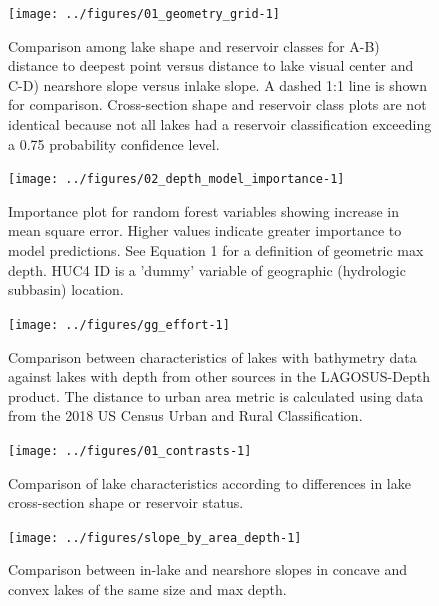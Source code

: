 \documentclass[draft,wrr]{agutexSI2019}
\begin{document}
\begin{figure}
      \noindent\texttt{[image: ../figures/01\_geometry\_grid-1]}
      \caption{Comparison among lake shape and reservoir classes for A-B) distance to deepest point versus distance to lake visual center and C-D) nearshore slope versus inlake slope. A dashed 1:1 line is shown for comparison. Cross-section shape and reservoir class plots are not identical because not all lakes had a reservoir classification exceeding a 0.75 probability confidence level.}\label{figS4}
      \end{figure}

\begin{figure}
      \noindent\texttt{[image: ../figures/02\_depth\_model\_importance-1]}
      \caption{Importance plot for random forest variables showing increase in mean square error. Higher values indicate greater importance to model predictions. See Equation 1 for a definition of geometric max depth. HUC4 ID is a 'dummy' variable of geographic (hydrologic subbasin) location.}\label{figS5}
      \end{figure}

\begin{figure}
      \begin{center}\texttt{[image: ../figures/gg\_effort-1]}\end{center}
            \caption{Comparison between characteristics of lakes with bathymetry data against lakes with depth from other sources in the LAGOSUS-Depth product. The distance to urban area metric is calculated using data from the 2018 US Census Urban and Rural Classification.}\label{figS6}
      \end{figure}

\clearpage
\begin{figure}
      \begin{center}\texttt{[image: ../figures/01\_contrasts-1]}\end{center}
      \caption{Comparison of lake characteristics according to differences in lake cross-section shape or reservoir status.}\label{figS7}
      \end{figure}

\clearpage

\begin{figure}
      \begin{center}
        \texttt{[image: ../figures/slope\_by\_area\_depth-1]}
      \end{center}
      \caption{Comparison between in-lake and nearshore slopes in concave and convex lakes of the same size and max depth.}\label{figS9}
    \end{figure}
\clearpage
\end{document}
